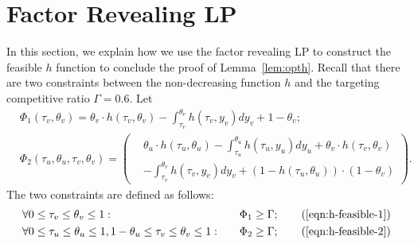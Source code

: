 \section{Factor Revealing LP}
\label{app:factor_lp}
In this section, we explain how we use the factor revealing LP to construct the feasible $h$ function to conclude the proof of Lemma~\ref{lem:opth}. Recall that there are two constraints between the non-decreasing function $h$ and the targeting competitive ratio $\Gamma = 0.6$. Let
\begin{align*}
    &\Phi_1(\tau_v,\theta_v) = \theta_v \cdot h(\tau_v, \theta_v) - \int_{\tau_v}^{\theta_v} h(\tau_v, y_v) dy_v + 1-\theta_v; \\ 
    &\Phi_2(\tau_u,\theta_u,\tau_v,\theta_v) = \left(
    \begin{aligned}
        &\theta_u \cdot h(\tau_u, \theta_u) - \int_{\tau_u}^{\theta_u} h(\tau_u, y_u) dy_u + \theta_v \cdot h(\tau_v, \theta_v)\\
        & - \int_{\tau_v}^{\theta_v} h(\tau_v, y_v) dy_v + (1-h(\tau_u, \theta_u)) \cdot (1-\theta_v)
    \end{aligned}
    \right).
\end{align*}
The two constraints are defined as follows: 
\begin{align}
	& \forall 0\le \tau_v \le \theta_v \le 1: &\Phi_1 \ge \Gamma; \tag{\ref{eqn:h-feasible-1}} \\
    & \forall 0\le \tau_u \le \theta_u \le 1, 1-\theta_u\le \tau_v \le \theta_v \le 1 :\quad  & \Phi_2 \ge \Gamma; \tag{\ref{eqn:h-feasible-2}}
\end{align}

